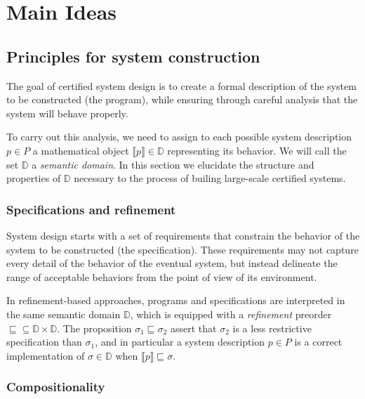 \documentclass[acmsmall,timestamp,review]{acmart}
\begin{document}


\section{Main Ideas} \label{sec:mainideas} %

\subsection{Principles for system construction} %


The goal of certified system design is
to create a formal description of
the system to be constructed (the program),
while ensuring through careful analysis that the system
will behave properly.

To carry out this analysis,
we need to assign
to each possible system description $p \in P$
a mathematical object $\llbracket p \rrbracket \in \mathbb{D}$
representing its behavior.
We will call the set $\mathbb{D}$ a \emph{semantic domain}.
In this section we elucidate
the structure and properties of $\mathbb{D}$
necessary to the process of builing
large-scale certified systems.


\subsubsection{Specifications and refinement} %

System design starts with a set of requirements
that constrain the behavior of the system to be constructed
(the specification).
These requirements may not capture every detail
of the behavior of the eventual system,
but instead delineate the range of acceptable behaviors
from the point of view of its environment.

In refinement-based approaches,
programs and specifications are interpreted in the same
semantic domain $\mathbb{D}$,
which is equipped with a \emph{refinement} preorder
${\sqsubseteq} \subseteq \mathbb{D} \times \mathbb{D}$.
The proposition $\sigma_1 \sqsubseteq \sigma_2$
assert that $\sigma_2$ is a less restrictive specification than $\sigma_1$,
and in particular a system description $p \in P$ is a correct implementation
of $\sigma \in \mathbb{D}$ when
$\llbracket p \rrbracket \sqsubseteq \sigma$.


\subsubsection{Compositionality} %
\end{document}
